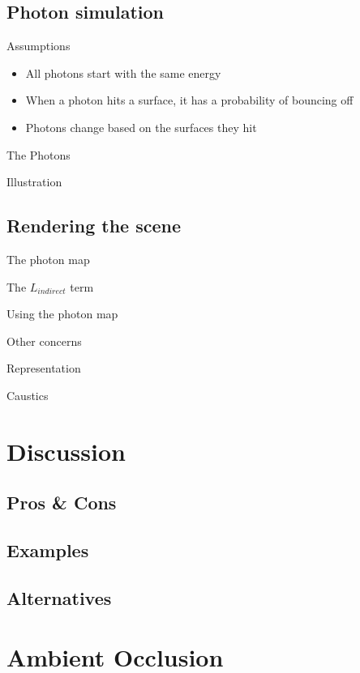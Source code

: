 \documentclass{beamer}
\begin{document}
		\subsection{Photon simulation}
			\begin{frame}{Assumptions}
				\begin{itemize}
					\item<2-> All photons start with the same energy
					\item<3-> When a photon hits a surface, it has a probability of bouncing off
					\item<4-> Photons change based on the surfaces they hit
				\end{itemize}
			\end{frame}
			\begin{frame}{The Photons}\end{frame}
			\begin{frame}{Illustration}\end{frame}

		\subsection{Rendering the scene}
			\begin{frame}{The photon map}\end{frame}
			\begin{frame}{The \(L_{indirect}\) term}\end{frame}
			\begin{frame}{Using the photon map}\end{frame}
			\begin{frame}{Other concerns}\end{frame}
			\begin{frame}{Representation}\end{frame}
			\begin{frame}{Caustics}\end{frame}

	\section{Discussion}
		\subsection{Pros \& Cons}
		\subsection{Examples}
		\subsection{Alternatives}

	\section{Ambient Occlusion}
\end{document}
